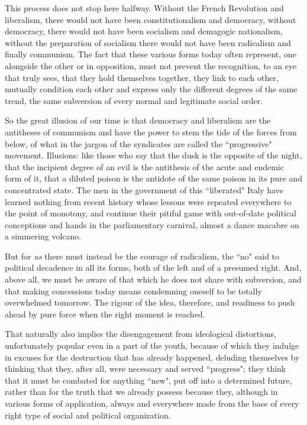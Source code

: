 This process does not stop here halfway. Without the French Revolution and liberalism, there would not have been constitutionalism and democracy, without democracy, there would not have been socialism and demagogic nationalism, without the preparation of socialism there would not have been radicalism and finally communism. The fact that these various forms today often represent, one alongside the other or in opposition, must not prevent the recognition, to an eye that truly sees, that they hold themselves together, they link to each other, mutually condition each other and express only the different degrees of the same trend, the same subversion of every normal and legitimate social order.

So the great illusion of our time is that democracy and liberalism are the antitheses of communism and have the power to stem the tide of the forces from below, of what in the jargon of the syndicates are called the ``progressive" movement. Illusions: like those who say that the dusk is the opposite of the night, that the incipient degree of an evil is the antithesis of the acute and endemic form of it, that a diluted poison is the antidote of the same poison in its pure and concentrated state. The men in the government of this ``liberated" Italy have learned nothing from recent history whose lessons were repeated everywhere to the point of monotony, and continue their pitiful game with out-of-date political conceptions and hands in the parliamentary carnival, almost a dance macabre on a simmering volcano.

But for \emph{us} there must instead be the courage of radicalism, the ``no" said to political decadence in all its forms, both of the left and of a presumed right. And, above all, we must be aware of that which he does not share with subversion, and that making concessions today means condemning oneself to be totally overwhelmed tomorrow. The rigour of the idea, therefore, and readiness to push ahead by pure force when the right moment is reached.

That naturally also implies the disengagement from ideological distortions, unfortunately popular even in a part of the youth, because of which they indulge in excuses for the destruction that has already happened, deluding themselves by thinking that they, after all, were necessary and served ``progress"; they think that it must be combated for anything ``new", put off into a determined future, rather than for the truth that we already possess because they, although in various forms of application, always and everywhere made from the base of every right type of social and political organization.

